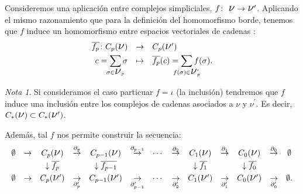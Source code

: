 \documentclass[12pt, a4paper, twoside]{book}
\numberwithin{equation}{section}
\theoremstyle{definition}
\theoremstyle{remark}
\newtheorem*{remark}{Nota}
\theoremstyle{plain}
\begin{document}
	Consideremos una aplicación entre complejos simpliciales, $f\colon
	\text{
	{\Large $\nu$}}\rightarrow\text{{\Large $\nu$}}'$. Aplicando el mismo 
	razonamiento que para la definición del homomorfismo borde, tenemos 
	que $f$ induce un homomorfismo entre espacios vectoriales de cadenas :
	\begin{equation}
		\label{hom:induc}
		\left.
		\begin{array}{lll}
			\overline{f_{p}}\colon C_{p}(\text{{\Large $\nu$}}) & 
				\rightarrow & C_{p}(\text{{\Large $\nu$}}')
				\\[3pt] 
			\multicolumn{1}{r}{c=\displaystyle \sum_{\mathclap{
			\sigma \in \text{{\Large $\nu$}$_{p}$}}}\sigma} & 
			\mapsto & 
			\overline{f_{p}}(c)=\displaystyle \sum_{\mathclap{
			f(\sigma) \in \text{{\Large $\nu$}$_{p}'$}}}f(\sigma).
		\end{array}
		\right. 
	\end{equation}
	\begin{remark}
		Si consideramos el caso particuar $f=\iota$ (la inclusión) 
		tendremos que $f$ induce una inclusión entre los complejos de 
		cadenas asociados a {\Large $\nu$} y 
		{\Large $\nu$}$^{\prime}$. Es decir, 
		$C_{*}(\text{{\Large $\nu$}}) \subset C_{*}(\text{{\Large 
		$\nu$}}^{\prime})$.
	\end{remark}
	Además, tal $f$ nos permite construir la secuencia:
	\begin{equation}
		\label{hom: gruphom}
		 \left.
		\begin{array}{ccccccccccccc}
			\emptyset & \rightarrow & C_{p}(
			\text{{\Large $\nu$}}) & \overset{\partial_{p}}{
			\rightarrow} & C_{p-1}(
			\text{{\Large $\nu$}}) & \overset{\partial_{p-1}}{
			\rightarrow} &\cdots & 
			\overset{\partial_{2}}{
			\rightarrow} & C_{1}(
			\text{{\Large $\nu$}})& \overset{\partial_{1}}{
			\rightarrow} & C_{0}(
			\text{{\Large $\nu$}})& \overset{\partial_{0}}{
			\rightarrow} & \emptyset\\[3pt]

			 & & \downarrow \overline{f_{p}}& & \downarrow 
			\overline{f_{p-1}}& 
			 & & & \downarrow \overline{f_{1}}
			 & & \downarrow \overline{f_{0}} & & \\ [3pt]
			\emptyset & \rightarrow & C_{p}(
			\text{{\Large $\nu$}}') &\underset{\partial_{p}'}{
			\rightarrow}  & C_{p-1}(
			\text{{\Large $\nu$}}') & \underset{\partial_{p-1}'}{
			\rightarrow}&\cdots & 
			\underset{\partial_{2}'}{
			\rightarrow} & C_{1}(
			\text{{\Large $\nu$}}')& \underset{\partial_{1}'}{
			\rightarrow} & C_{0}(
			\text{{\Large $\nu$}}')& \underset{\partial_{0}'}{
			\rightarrow} & \emptyset. \\
		\end{array}
		\right. 
	\end{equation}
\end{document}
